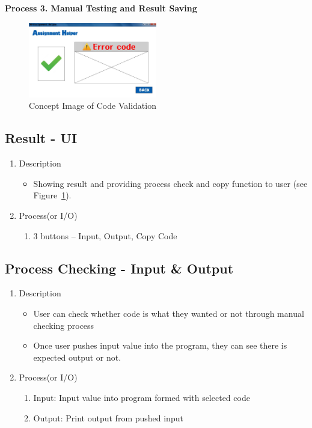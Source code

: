 \documentclass[conference]{IEEEtran}
\begin{document}
\textbf{Process 3. Manual Testing and Result Saving}


\textit{}
\begin{figure}[h]
\centering
\includegraphics[width=0.5\textwidth]{./figures/UI_code_validation_fail.jpg}  
\caption{Concept Image of Code Validation}
\label{fig_concept_validation_manual}
\end{figure}


\subsection{Result - UI}
\begin{enumerate}
  \item Description
  \begin{itemize}
    \item Showing result and providing process check and copy function to user (see Figure~\ref{fig_concept_validation_manual}).
  \end{itemize}
  \item Process(or I/O)
  \begin{enumerate}
    \item 3 buttons – Input, Output, Copy Code
  \end{enumerate}
\end{enumerate}
\textit{}

\subsection{Process Checking - Input \& Output}
\begin{enumerate}
  \item Description
  \begin{itemize}
    \item User can check whether code is what they wanted or not through manual checking process
    \item Once user pushes input value into the program, they can see there is expected output or not.
  \end{itemize}
  \item Process(or I/O)
  \begin{enumerate}
    \item Input: Input value into program formed with selected code
    \item Output: Print output from pushed input
  \end{enumerate}
\end{enumerate}
\textit{}
\end{document}
